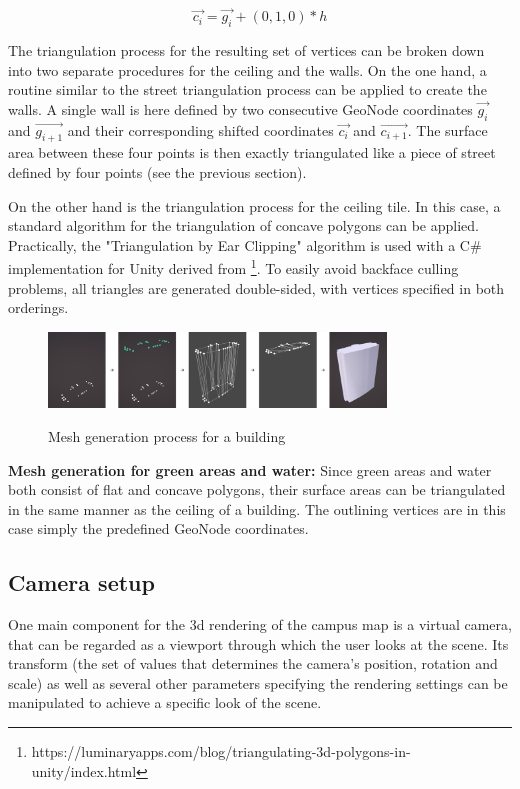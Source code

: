 \[\vec{c_{i}} = \vec{g_{i}} + (0, 1, 0) * h\]

The triangulation process for the resulting set of vertices can be broken down into two separate procedures for the ceiling and the walls. On the one hand, a routine similar to the street triangulation process can be applied to create the walls. A single wall is here defined by two consecutive GeoNode coordinates $\vec{g_{i}}$ and $\vec{g_{i + 1}}$ and their corresponding shifted coordinates $\vec{c_{i}}$ and $\vec{c_{i + 1}}$. The surface area between these four points is then exactly triangulated like a piece of street defined by four points (see the previous section).

On the other hand is the triangulation process for the ceiling tile. In this case, a standard algorithm for the triangulation of concave polygons can be applied. Practically, the "Triangulation by Ear Clipping" \cite{triangulation_by_ear_clipping} algorithm is used with a C\# implementation for Unity derived from \footnote{https://luminaryapps.com/blog/triangulating-3d-polygons-in-unity/index.html}. To easily avoid backface culling problems, all triangles are generated double-sided, with vertices specified in both orderings.

\begin{figure}[H]
	\centering
	\includegraphics[width=0.8\textwidth]{images/building_mesh_generation.png}\\
	\caption{Mesh generation process for a building}
\end{figure}

\textbf{Mesh generation for green areas and water:} Since green areas and water both consist of flat and concave polygons, their surface areas can be triangulated in the same manner as the ceiling of a building. The outlining vertices are in this case simply the predefined GeoNode coordinates.

\subsection{Camera setup}
One main component for the 3d rendering of the campus map is a virtual camera, that can be regarded as a viewport through which the user looks at the scene. Its transform (the set of values that determines the camera's position, rotation and scale) as well as several other parameters specifying the rendering settings can be manipulated to achieve a specific look of the scene.


